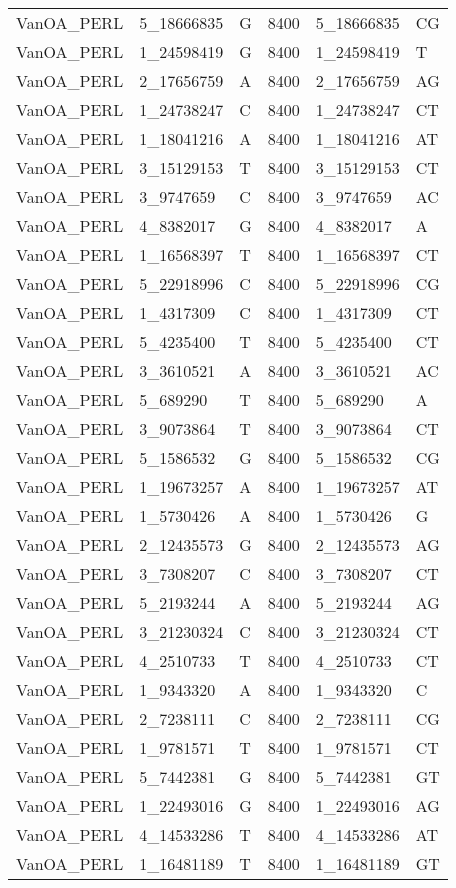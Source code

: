 \begin{center}
\begin{longtable}{|l|l|l|l|l|l|}
VanOA\_PERL&5\_18666835&G&8400&5\_18666835&CG\\
VanOA\_PERL&1\_24598419&G&8400&1\_24598419&T\\
VanOA\_PERL&2\_17656759&A&8400&2\_17656759&AG\\
VanOA\_PERL&1\_24738247&C&8400&1\_24738247&CT\\
VanOA\_PERL&1\_18041216&A&8400&1\_18041216&AT\\
VanOA\_PERL&3\_15129153&T&8400&3\_15129153&CT\\
VanOA\_PERL&3\_9747659&C&8400&3\_9747659&AC\\
VanOA\_PERL&4\_8382017&G&8400&4\_8382017&A\\
VanOA\_PERL&1\_16568397&T&8400&1\_16568397&CT\\
VanOA\_PERL&5\_22918996&C&8400&5\_22918996&CG\\
VanOA\_PERL&1\_4317309&C&8400&1\_4317309&CT\\
VanOA\_PERL&5\_4235400&T&8400&5\_4235400&CT\\
VanOA\_PERL&3\_3610521&A&8400&3\_3610521&AC\\
VanOA\_PERL&5\_689290&T&8400&5\_689290&A\\
VanOA\_PERL&3\_9073864&T&8400&3\_9073864&CT\\
VanOA\_PERL&5\_1586532&G&8400&5\_1586532&CG\\
VanOA\_PERL&1\_19673257&A&8400&1\_19673257&AT\\
VanOA\_PERL&1\_5730426&A&8400&1\_5730426&G\\
VanOA\_PERL&2\_12435573&G&8400&2\_12435573&AG\\
VanOA\_PERL&3\_7308207&C&8400&3\_7308207&CT\\
VanOA\_PERL&5\_2193244&A&8400&5\_2193244&AG\\
VanOA\_PERL&3\_21230324&C&8400&3\_21230324&CT\\
VanOA\_PERL&4\_2510733&T&8400&4\_2510733&CT\\
VanOA\_PERL&1\_9343320&A&8400&1\_9343320&C\\
VanOA\_PERL&2\_7238111&C&8400&2\_7238111&CG\\
VanOA\_PERL&1\_9781571&T&8400&1\_9781571&CT\\
VanOA\_PERL&5\_7442381&G&8400&5\_7442381&GT\\
VanOA\_PERL&1\_22493016&G&8400&1\_22493016&AG\\
VanOA\_PERL&4\_14533286&T&8400&4\_14533286&AT\\
VanOA\_PERL&1\_16481189&T&8400&1\_16481189&GT\\

\end{longtable}
\end{center}
